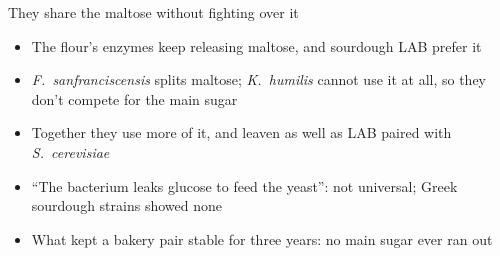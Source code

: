 \documentclass[aspectratio=169,11pt]{beamer}
\begin{document}
\begin{frame}{They share the maltose without fighting over it}
  \small
  \begin{itemize}\setlength{\itemsep}{2pt}
    \item The flour's enzymes keep releasing maltose, and sourdough LAB prefer it
    \item \textit{F.\ sanfranciscensis} splits maltose; \textit{K.\ humilis} cannot use it at all, so they don't compete for the main sugar
    \item Together they use more of it, and leaven as well as LAB paired with \textit{S.\ cerevisiae}
    \item ``The bacterium leaks glucose to feed the yeast'': not universal; Greek sourdough strains showed none
    \item What kept a bakery pair stable for three years: no main sugar ever ran out
  \end{itemize}
\end{frame}
\end{document}
